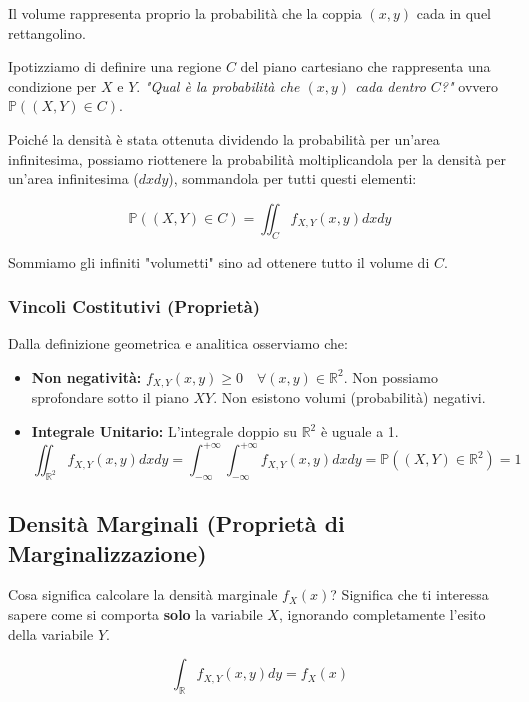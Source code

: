 Il volume rappresenta proprio la probabilità che la coppia $(x,y)$ cada in quel rettangolino.

Ipotizziamo di definire una regione $C$ del piano cartesiano che rappresenta una condizione per $X$ e $Y$. \textit{"Qual è la probabilità che $(x,y)$ cada dentro $C$?"} ovvero $\mathbb{P}((X,Y) \in C)$.

Poiché la densità è stata ottenuta dividendo la probabilità per un'area infinitesima, possiamo riottenere la probabilità moltiplicandola per la densità per un'area infinitesima ($dx dy$), sommandola per tutti questi elementi:

\begin{equation}
\mathbb{P}((X,Y) \in C) = \iint_C f_{X,Y}(x,y) dx dy
\end{equation}

Sommiamo gli infiniti "volumetti" sino ad ottenere tutto il volume di $C$.

\subsubsection*{Vincoli Costitutivi (Proprietà)}
Dalla definizione geometrica e analitica osserviamo che:
\begin{itemize}
    \item \textbf{Non negatività:} $f_{X,Y}(x,y) \ge 0 \quad \forall (x,y) \in \mathbb{R}^2$. Non possiamo sprofondare sotto il piano $XY$. Non esistono volumi (probabilità) negativi.
    \item \textbf{Integrale Unitario:} L'integrale doppio su $\mathbb{R}^2$ è uguale a 1.
    \begin{equation}
    \iint_{\mathbb{R}^2} f_{X,Y}(x,y) dx dy = \int_{-\infty}^{+\infty} \int_{-\infty}^{+\infty} f_{X,Y}(x,y) dx dy = \mathbb{P}((X,Y) \in \mathbb{R}^2) = 1
    \end{equation}
\end{itemize}

\subsection{Densità Marginali (Proprietà di Marginalizzazione)}

Cosa significa calcolare la densità marginale $f_X(x)$?
Significa che ti interessa sapere come si comporta \textbf{solo} la variabile $X$, ignorando completamente l'esito della variabile $Y$.

\begin{equation}
\int_{\mathbb{R}} f_{X,Y}(x,y) dy = f_X(x)
\end{equation}

